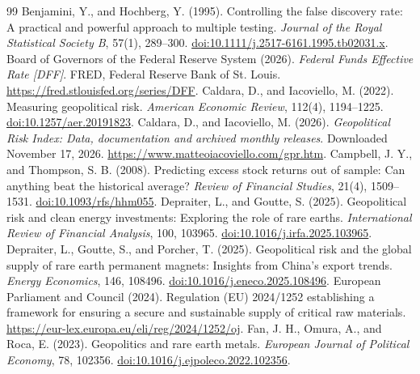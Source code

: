 \begin{thebibliography}{99}
\small
{} Benjamini, Y., and Hochberg, Y. (1995). Controlling the false discovery rate: A practical and powerful approach to multiple testing. \textit{Journal of the Royal Statistical Society B}, 57(1), 289–300. \href{https://doi.org/10.1111/j.2517-6161.1995.tb02031.x}{doi:10.1111/j.2517-6161.1995.tb02031.x}.
 Board of Governors of the Federal Reserve System (2026). \textit{Federal Funds Effective Rate [DFF]}. FRED, Federal Reserve Bank of St. Louis. \url{https://fred.stlouisfed.org/series/DFF}.
 Caldara, D., and Iacoviello, M. (2022). Measuring geopolitical risk. \textit{American Economic Review}, 112(4), 1194–1225. \href{https://doi.org/10.1257/aer.20191823}{doi:10.1257/aer.20191823}.
 Caldara, D., and Iacoviello, M. (2026). \textit{Geopolitical Risk Index: Data, documentation and archived monthly releases}. Downloaded November 17, 2026. \url{https://www.matteoiacoviello.com/gpr.htm}.
 Campbell, J. Y., and Thompson, S. B. (2008). Predicting excess stock returns out of sample: Can anything beat the historical average? \textit{Review of Financial Studies}, 21(4), 1509–1531. \href{https://doi.org/10.1093/rfs/hhm055}{doi:10.1093/rfs/hhm055}.
 Depraiter, L., and Goutte, S. (2025). Geopolitical risk and clean energy investments: Exploring the role of rare earths. \textit{International Review of Financial Analysis}, 100, 103965. \href{https://doi.org/10.1016/j.irfa.2025.103965}{doi:10.1016/j.irfa.2025.103965}.
 Depraiter, L., Goutte, S., and Porcher, T. (2025). Geopolitical risk and the global supply of rare earth permanent magnets: Insights from China's export trends. \textit{Energy Economics}, 146, 108496. \href{https://doi.org/10.1016/j.eneco.2025.108496}{doi:10.1016/j.eneco.2025.108496}.
 European Parliament and Council (2024). Regulation (EU) 2024/1252 establishing a framework for ensuring a secure and sustainable supply of critical raw materials. \url{https://eur-lex.europa.eu/eli/reg/2024/1252/oj}.
 Fan, J. H., Omura, A., and Roca, E. (2023). Geopolitics and rare earth metals. \textit{European Journal of Political Economy}, 78, 102356. \href{https://doi.org/10.1016/j.ejpoleco.2022.102356}{doi:10.1016/j.ejpoleco.2022.102356}.

\end{thebibliography}
